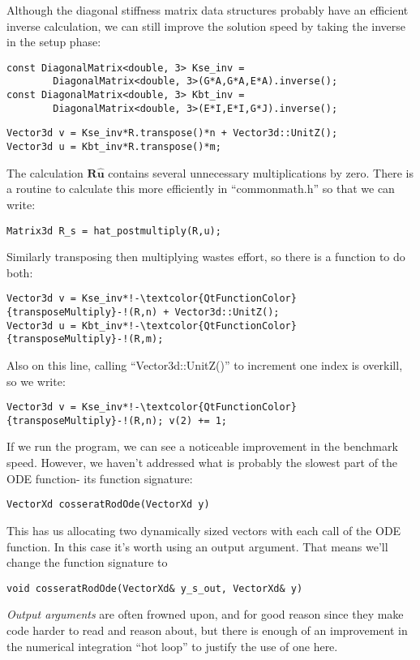 \documentclass[12pt]{article}
\begin{document}
Although the diagonal stiffness matrix data structures probably have an efficient inverse calculation, we can still improve the solution speed by taking the inverse in the setup phase:
\begin{lstlisting}
const DiagonalMatrix<double, 3> Kse_inv =
		DiagonalMatrix<double, 3>(G*A,G*A,E*A).inverse();
const DiagonalMatrix<double, 3> Kbt_inv =
		DiagonalMatrix<double, 3>(E*I,E*I,G*J).inverse();
\end{lstlisting}
\begin{lstlisting}
Vector3d v = Kse_inv*R.transpose()*n + Vector3d::UnitZ();
Vector3d u = Kbt_inv*R.transpose()*m;
\end{lstlisting}
The calculation $\boldsymbol{R}\widehat{\boldsymbol{u}}$ contains several unnecessary multiplications by zero. There is a routine to calculate this more efficiently in ``commonmath.h'' so that we can write:
\begin{lstlisting}
Matrix3d R_s = hat_postmultiply(R,u);
\end{lstlisting}
Similarly transposing then multiplying wastes effort, so there is a function to do both:
\begin{lstlisting}
Vector3d v = Kse_inv*!-\textcolor{QtFunctionColor}{transposeMultiply}-!(R,n) + Vector3d::UnitZ();
Vector3d u = Kbt_inv*!-\textcolor{QtFunctionColor}{transposeMultiply}-!(R,m);
\end{lstlisting}
Also on this line, calling ``Vector3d::UnitZ()'' to increment one index is overkill, so we write:
\begin{lstlisting}
Vector3d v = Kse_inv*!-\textcolor{QtFunctionColor}{transposeMultiply}-!(R,n); v(2) += 1;
\end{lstlisting}

If we run the program, we can see a noticeable improvement in the benchmark speed. However, we haven't addressed what is probably the slowest part of the ODE function- its function signature:
\begin{lstlisting}
VectorXd cosseratRodOde(VectorXd y)
\end{lstlisting}
This has us allocating two dynamically sized vectors with each call of the ODE function. In this case it's worth using an output argument. That means we'll change the function signature to
\begin{lstlisting}
void cosseratRodOde(VectorXd& y_s_out, VectorXd& y)
\end{lstlisting}
\emph{Output arguments} are often frowned upon, and for good reason since they make code harder to read and reason about, but there is enough of an improvement in the numerical integration ``hot loop'' to justify the use of one here.
\end{document}

